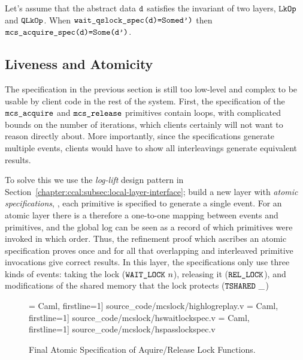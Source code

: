 \begin{theorem} 
    Let's assume that the abstract data ${\mathrm{\texttt{d}}}$ satisfies the invariant of two layers,
    ${\mathrm{\texttt{LkOp}}}$ and ${\mathrm{\texttt{QLkOp}}}$. When 
${\mathrm{\texttt{wait\_qslock\_spec}}}{\mathrm{\texttt{(d)=}}}{\mathrm{\texttt{Some}}}{\mathrm{\texttt{d')}}}$ then 
${\mathrm{\texttt{mcs\_acquire\_spec}}}{\mathrm{\texttt{(d)=}}}{\mathrm{\texttt{Some}}}{\mathrm{\texttt{(d')}}}$.
\end{theorem}


\subsection{Liveness and Atomicity}
\label{chapter:mcslock:sec:liveness-atomicity}

The specification in the previous section is still too low-level and
complex to be usable by client code in the rest of the system.  First,
the specification of the ${\mathrm{\texttt{mcs\_acquire}}}$ and
${\mathrm{\texttt{mcs\_release}}}$ primitives contain loops, with complicated
bounds on the number of iterations, which clients certainly will not
want to reason directly about.  More importantly, since the
specifications generate multiple events, clients would have to show
all interleavings generate equivalent results.

To solve this we use the \textit{log-lift} design
pattern in Section~\ref{chapter:ccal:subsec:local-layer-interface}; build a new layer with \emph{atomic specifications},
\ie, each primitive is specified to generate  a single event.
For an atomic layer there is a
therefore a one-to-one mapping between events and primitives, and the global log
can be seen as a record of which primitives were invoked in which
order. Thus, the refinement proof which ascribes an atomic
specification proves once and for all that overlapping and interleaved
primitive invocations give correct results.
In this layer, the specifications only use three kinds 
of events: taking the lock (${\mathrm{\texttt{WAIT\_LOCK}}}~{n}$),
releasing it (${\mathrm{\texttt{REL\_LOCK}}}$), and modifications of the shared
memory that the lock protects (${\mathrm{\texttt{TSHARED}}}~{\_}$)



\begin{figure}
 = Caml, firstline=1] {source_code/mcslock/highlogreplay.v}
 = Caml, firstline=1] {source_code/mcslock/hswaitlockspec.v}
 = Caml, firstline=1] {source_code/mcslock/hspasslockspec.v}
\caption{Final Atomic Specification of Aquire/Release Lock Functions.}
\label{fig:chapter:mcslock:hswaitlockspec}
\end{figure}

